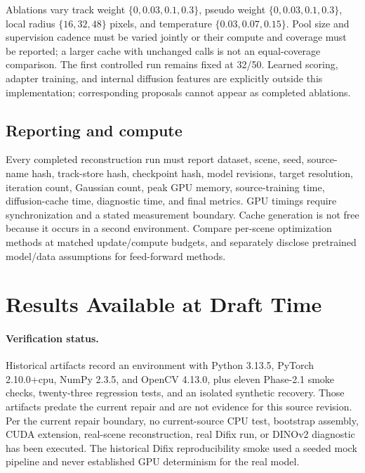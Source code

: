 \documentclass[10pt,twocolumn,letterpaper]{article}
\begin{document}
Ablations vary track weight $\{0,0.03,0.1,0.3\}$, pseudo weight $\{0,0.03,0.1,0.3\}$, local radius $\{16,32,48\}$ pixels, and temperature $\{0.03,0.07,0.15\}$. Pool size and supervision cadence must be varied jointly or their compute and coverage must be reported; a larger cache with unchanged calls is not an equal-coverage comparison. The first controlled run remains fixed at 32/50. Learned scoring, adapter training, and internal diffusion features are explicitly outside this implementation; corresponding proposals cannot appear as completed ablations.

\subsection{Reporting and compute}
Every completed reconstruction run must report dataset, scene, seed, source-name hash, track-store hash, checkpoint hash, model revisions, target resolution, iteration count, Gaussian count, peak GPU memory, source-training time, diffusion-cache time, diagnostic time, and final metrics. GPU timings require synchronization and a stated measurement boundary. Cache generation is not free because it occurs in a second environment. Compare per-scene optimization methods at matched update/compute budgets, and separately disclose pretrained model/data assumptions for feed-forward methods.

\section{Results Available at Draft Time}
\paragraph{Verification status.} Historical artifacts record an environment with Python 3.13.5, PyTorch 2.10.0+cpu, NumPy 2.3.5, and OpenCV 4.13.0, plus eleven Phase-2.1 smoke checks, twenty-three regression tests, and an isolated synthetic recovery. Those artifacts predate the current repair and are not evidence for this source revision. Per the current repair boundary, no current-source CPU test, bootstrap assembly, CUDA extension, real-scene reconstruction, real Difix run, or DINOv2 diagnostic has been executed. The historical Difix reproducibility smoke used a seeded mock pipeline and never established GPU determinism for the real model.
\end{document}

